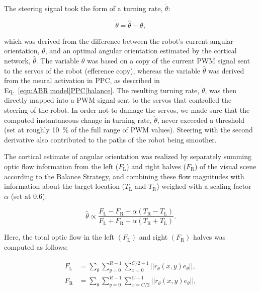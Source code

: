 The steering signal took the form of a turning rate, $\dot{\theta}$:

\begin{equation}
\dot{\theta} = \hat{\theta} - \theta,
\label{eqn:ABR|model|PPC|turning}
\end{equation}

which was derived from the difference between the robot's
current angular orientation, $\theta$, 
and an optimal angular orientation
estimated by the cortical network, $\hat{\theta}$. 
The variable $\theta$ was based on
a copy of the current PWM signal sent to the servos of the robot
(efference copy), whereas the variable $\hat{\theta}$
was derived from the neural activation in \ac{PPC}, 
as described in Eq.~\ref{eqn:ABR|model|PPC|balance}.
The resulting turning rate, $\dot{\theta}$,
was then directly mapped into a PWM signal sent to the
servos that controlled the steering of the robot. In order not to
damage the servos, we made sure that the computed instantaneous
change in turning rate, $\ddot{\theta}$, 
never exceeded a threshold (set at
roughly \SI{10}{\percent} of the full range of PWM values). 
Steering with the
second derivative also contributed to the paths of the robot being
smoother.

The cortical estimate of angular orientation was realized by
separately summing optic flow information from the left 
($F_{\textrm{L}}$) and
right halves ($F_{\textrm{R}}$)
of the visual scene according to the Balance
Strategy, and combining these flow magnitudes with information
about the target location ($T_{\textrm{L}}$ and $T_{\textrm{R}}$) 
weighed with a scaling factor $\alpha$ (set at $0.6$):

\begin{equation}
\hat{\theta} \propto
\frac{
	F_\textrm{L} - F_\textrm{R} + \alpha (T_\textrm{R} - T_\textrm{L})
}{
	F_\textrm{L} + F_\textrm{R} + \alpha (T_\textrm{R} + T_\textrm{L})
}.
\label{eqn:ABR|model|PPC|balance}
\end{equation}

Here, the total optic flow in the left $(F_\textrm{L})$
and right $(F_\textrm{R})$ halves was computed as follows:

\begin{align}
F_\textrm{L} & = \sum_\theta \sum_{y=0}^{R-1} \sum_{x=0}^{C/2-1}
	|| r_\theta(x,y) e_\theta ||, \label{eqn:ABR|model|PPC|FL} \\
F_\textrm{R} & = \sum_\theta \sum_{y=0}^{R-1} \sum_{x=C/2}^{C-1}
	|| r_\theta(x,y) e_\theta ||, \label{eqn:ABR|model|PPC|FR}
\end{align}


